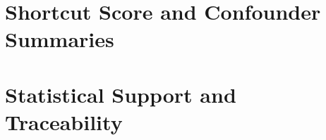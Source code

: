 \documentclass[11pt]{article}
\begin{document}
\begin{table}[h]
  \centering
  \caption{Extended GenomeCF-Synth shortcut-conflict and motif-grammar results.}
  \scriptsize
  \resizebox{\textwidth}{!}{}
\end{table}
\clearpage

\section{Shortcut Score and Confounder Summaries}

\begin{table}[h]
  \centering
  \caption{GenomeCF Shortcut Score summary.}
  \small
  
\end{table}

\begin{table}[h]
  \centering
  \caption{Per-task Shortcut Score components.}
  \scriptsize
  \resizebox{\textwidth}{!}{}
\end{table}

\begin{table}[h]
  \centering
  \caption{Confounder summary on the sampled official test subsets used for the completed benchmark budget.}
  \scriptsize
  \resizebox{\textwidth}{!}{}
\end{table}

\begin{table}[h]
  \centering
  \caption{Human-task chromosome-fold counts on the sampled official test subsets.}
  \small
  
\end{table}

\section{Statistical Support and Traceability}

\begin{table}[h]
  \centering
  \caption{Statistical support for the main manuscript claims. Bootstrap confidence intervals are reported where available from aggregated analyses; direct registry point estimates are retained for single-assay case-study and synthetic-mechanism claims.}
  \scriptsize
  \resizebox{\textwidth}{!}{}
\end{table}
\end{document}
